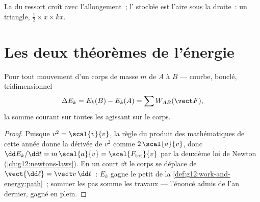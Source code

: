 \begin{omfigure}

{\small La  du ressort croît avec l'allongement~;
l' stockée est l'aire sous la droite~: un triangle,
$\tfrac12 \times x \times kx$.}
\end{omfigure}

\section{Les deux théorèmes de l'énergie}

\begin{theorem}\label{thm:g12:work-and-energy:ketheorem}
Pour tout mouvement d'un corps de masse $m$ de $A$ à $B$ --- courbe,
bouclé, tridimensionnel ---
\[
\Delta E_k = E_k(B) - E_k(A) = \sum W_{AB}(\vect F),
\]
la somme courant sur toutes les  agissant sur le corps.
\end{theorem}

\begin{proof}
Puisque $v^2 = \scal{v}{v}$, la règle du produit des mathématiques
de cette année donne la dérivée de $v^2$ comme $2\,\scal{a}{v}$,
donc $\dd E_k/\dd t = m\,\scal{a}{v} = \scal{F_{\text{tot}}}{v}$ par
la deuxième loi de Newton
(\cref{ch:g12:newtons-laws}). En un court $\dd t$ le corps se déplace
de $\vect{\dd\ell} = \vect v\,\dd t$~: $E_k$ gagne le petit
 de la \cref{def:g12:work-and-energy:path}~; sommer les
pas somme les travaux --- l'énoncé admis de l'an dernier,
gagné en plein.
\end{proof}

